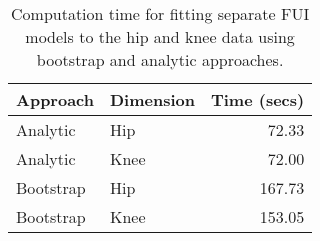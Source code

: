 \begin{table}[ht]
\centering
\begin{tabular}{llr}
  \toprule
{\bfseries Approach} & {\bfseries Dimension} & {\bfseries Time (secs)} \\ 
  \midrule
Analytic & Hip & 72.33 \\ 
  Analytic & Knee & 72.00 \\ 
  Bootstrap & Hip & 167.73 \\ 
  Bootstrap & Knee & 153.05 \\ 
   \bottomrule
\end{tabular}
\caption{Computation time for fitting separate FUI models to the hip and knee data using bootstrap and analytic approaches.} 
\label{tab:fui-comp-time}
\end{table}
